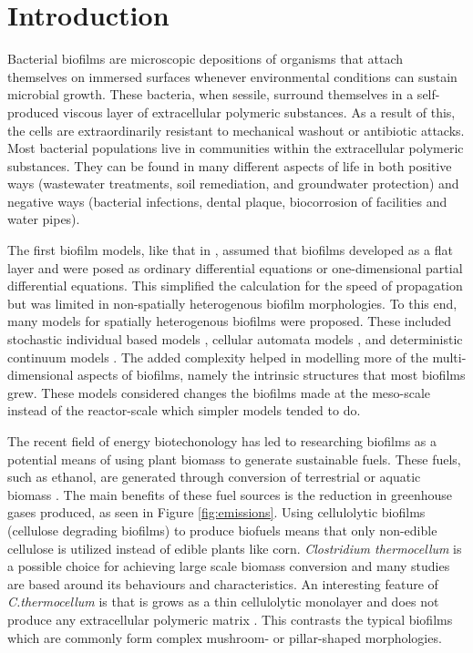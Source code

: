 \section{Introduction}

Bacterial biofilms are microscopic depositions of organisms that attach themselves on immersed surfaces whenever environmental conditions can sustain microbial growth.
These bacteria, when sessile, surround themselves in a self-produced viscous layer of extracellular polymeric substances.
As a result of this, the cells are extraordinarily resistant to mechanical washout or antibiotic attacks.
Most bacterial populations live in communities within the extracellular polymeric substances.
They can be found in many different aspects of life in both positive ways (wastewater treatments, soil remediation, and groundwater protection) and negative ways (bacterial infections, dental plaque, biocorrosion of facilities and water pipes).

The first biofilm models, like that in \cite{rittmann1980model}, assumed that biofilms developed as a flat layer and were posed as ordinary differential equations or one-dimensional partial differential equations.
This simplified the calculation for the speed of propagation but was limited in non-spatially heterogenous biofilm morphologies. %
To this end, many models for spatially heterogenous biofilms were proposed.
These included stochastic individual based models \citep{kreft2001individual}, cellular automata models \citep{picioreanu1998newCombined}, and deterministic continuum models \citep{eberl2001deterministic}. 
The added complexity helped in modelling more of the multi-dimensional aspects of biofilms, namely the intrinsic structures that most biofilms grew.
These models considered changes the biofilms made at the meso-scale instead of the reactor-scale which simpler models tended to do.

The recent field of energy biotechonology has led to researching biofilms as a potential means of using plant biomass to generate sustainable fuels. 
These fuels, such as ethanol, are generated through conversion of terrestrial or aquatic biomass \citep{lynd2008energy}.
The main benefits of these fuel sources is the reduction in greenhouse gases produced, as seen in Figure \ref{fig:emissions}.
Using cellulolytic biofilms (cellulose degrading biofilms) to produce biofuels means that only non-edible cellulose is utilized instead of edible plants like corn.
\textit{Clostridium thermocellum} is a possible choice for achieving large scale biomass conversion and many studies are based around its behaviours and characteristics.
An interesting feature of \textit{C.thermocellum} is that is grows as a thin cellulolytic monolayer and does not produce any extracellular polymeric matrix \citep{dumitrache2013formFunction}.
This contrasts the typical biofilms which are commonly form complex mushroom- or pillar-shaped morphologies.

